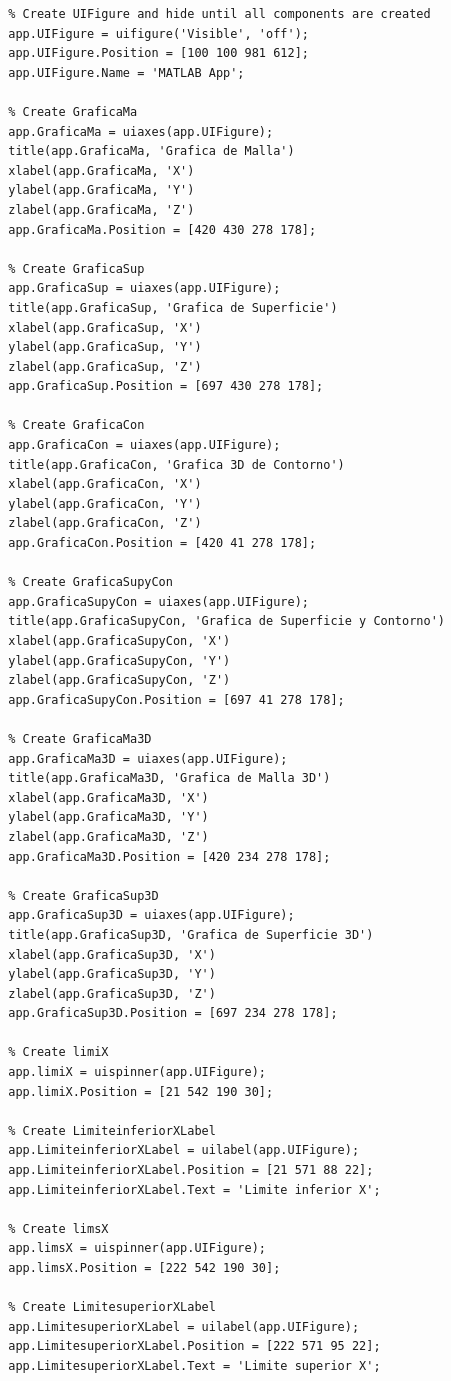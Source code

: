 \documentclass{article}
\begin{document}
\begin{lstlisting}
		% Create UIFigure and hide until all components are created
		app.UIFigure = uifigure('Visible', 'off');
		app.UIFigure.Position = [100 100 981 612];
		app.UIFigure.Name = 'MATLAB App';
		
		% Create GraficaMa
		app.GraficaMa = uiaxes(app.UIFigure);
		title(app.GraficaMa, 'Grafica de Malla')
		xlabel(app.GraficaMa, 'X')
		ylabel(app.GraficaMa, 'Y')
		zlabel(app.GraficaMa, 'Z')
		app.GraficaMa.Position = [420 430 278 178];
		
		% Create GraficaSup
		app.GraficaSup = uiaxes(app.UIFigure);
		title(app.GraficaSup, 'Grafica de Superficie')
		xlabel(app.GraficaSup, 'X')
		ylabel(app.GraficaSup, 'Y')
		zlabel(app.GraficaSup, 'Z')
		app.GraficaSup.Position = [697 430 278 178];
		
		% Create GraficaCon
		app.GraficaCon = uiaxes(app.UIFigure);
		title(app.GraficaCon, 'Grafica 3D de Contorno')
		xlabel(app.GraficaCon, 'X')
		ylabel(app.GraficaCon, 'Y')
		zlabel(app.GraficaCon, 'Z')
		app.GraficaCon.Position = [420 41 278 178];
		
		% Create GraficaSupyCon
		app.GraficaSupyCon = uiaxes(app.UIFigure);
		title(app.GraficaSupyCon, 'Grafica de Superficie y Contorno')
		xlabel(app.GraficaSupyCon, 'X')
		ylabel(app.GraficaSupyCon, 'Y')
		zlabel(app.GraficaSupyCon, 'Z')
		app.GraficaSupyCon.Position = [697 41 278 178];
		
		% Create GraficaMa3D
		app.GraficaMa3D = uiaxes(app.UIFigure);
		title(app.GraficaMa3D, 'Grafica de Malla 3D')
		xlabel(app.GraficaMa3D, 'X')
		ylabel(app.GraficaMa3D, 'Y')
		zlabel(app.GraficaMa3D, 'Z')
		app.GraficaMa3D.Position = [420 234 278 178];
		
		% Create GraficaSup3D
		app.GraficaSup3D = uiaxes(app.UIFigure);
		title(app.GraficaSup3D, 'Grafica de Superficie 3D')
		xlabel(app.GraficaSup3D, 'X')
		ylabel(app.GraficaSup3D, 'Y')
		zlabel(app.GraficaSup3D, 'Z')
		app.GraficaSup3D.Position = [697 234 278 178];
		
		% Create limiX
		app.limiX = uispinner(app.UIFigure);
		app.limiX.Position = [21 542 190 30];
		
		% Create LimiteinferiorXLabel
		app.LimiteinferiorXLabel = uilabel(app.UIFigure);
		app.LimiteinferiorXLabel.Position = [21 571 88 22];
		app.LimiteinferiorXLabel.Text = 'Limite inferior X';
		
		% Create limsX
		app.limsX = uispinner(app.UIFigure);
		app.limsX.Position = [222 542 190 30];
		
		% Create LimitesuperiorXLabel
		app.LimitesuperiorXLabel = uilabel(app.UIFigure);
		app.LimitesuperiorXLabel.Position = [222 571 95 22];
		app.LimitesuperiorXLabel.Text = 'Limite superior X';
		

\end{lstlisting}
\end{document}
